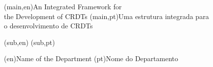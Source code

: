 
%




%
%
%
%
\nttitle(main,en){An Integrated Framework for\\the Development of CRDTs}%
\nttitle(main,pt){Uma estrutura integrada para\\o desenvolvimento de CRDTs}%

\nttitle(sub,en){}%
\nttitle(sub,pt){}%



%
%
%
%
\ntdepartment*(en){Name of the Department} %
\ntdepartment*(pt){Nome do Departamento}   %



